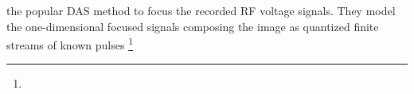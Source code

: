 the popular \ac{DAS} method to focus
the recorded \ac{RF} voltage signals.
They model
the one-dimensional focused signals composing
the image as
quantized finite streams of
known pulses%
\footnote{
}
